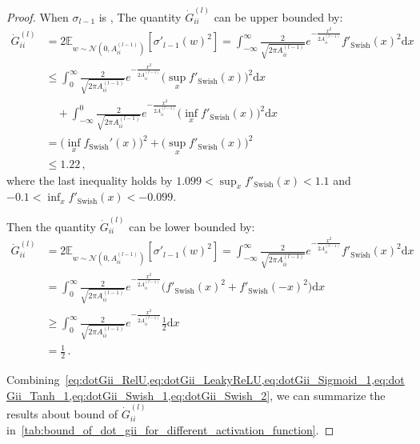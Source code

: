 \documentclass[nohyperref]{article}
\theoremstyle{plain}
\theoremstyle{definition}
\theoremstyle{remark}
\begin{document}
\begin{proof}
When $\sigma_{l-1}$ is , The quantity $\dot{G}^{(l)}_{ii}$ can be upper bounded by:
\begin{equation}
\begin{split}
\dot{G}_{ii}^{(l)}&=2\mathbb{E}_{w \sim \mathcal N(0,A_{ii}^{(l-1)})}[{\sigma}'_{l-1}(w)^2]=\int_{-\infty}^{\infty}\frac{2}{\sqrt{2\pi A_{ii}^{(l-1)}}}e^{-\frac{x^2}{2A_{ii}^{(l-1)}}}f'_{\mathrm{Swish}}(x)^2 \mathrm{d}x\\
&\leq \int_{0}^{\infty}\frac{2}{\sqrt{2\pi A_{ii}^{(l-1)}}}e^{-\frac{x^2}{2A_{ii}^{(l-1)}}}\bigg(\sup_x f'_{\mathrm{Swish}}(x)\bigg)^2 \mathrm{d}x\\
&\quad + \int_{-\infty}^{0}\frac{2}{\sqrt{2\pi A_{ii}^{(l-1)}}}e^{-\frac{x^2}{2A_{ii}^{(l-1)}}}\bigg(\inf_x f'_{\mathrm{Swish}}(x)\bigg)^2 \mathrm{d}x\\
&=\bigg(\inf_x f_{\mathrm{Swish}}'(x)\bigg)^2+\bigg(\sup_x f'_{\mathrm{Swish}}(x)\bigg)^2\\
&\leq 1.22\,,
\end{split}
\label{eq:dotGii_Swish_1}
\end{equation}
where the last inequality holds by $1.099 < \sup_x f'_{\mathrm{Swish}}(x) < 1.1$ and $-0.1 < \inf_x f'_{\mathrm{Swish}}(x) < -0.099$.

Then the quantity $\dot{G}^{(l)}_{ii}$ can be lower bounded by:
\begin{equation}
\begin{split}
\dot{G}_{ii}^{(l)}&=2\mathbb{E}_{w \sim \mathcal N(0,A_{ii}^{(l-1)})}[{\sigma}'_{l-1}(w)^2]=\int_{-\infty}^{\infty}\frac{2}{\sqrt{2\pi A_{ii}^{(l-1)}}}e^{-\frac{x^2}{2A_{ii}^{(l-1)}}}f'_{\mathrm{Swish}}(x)^2 \mathrm{d}x\\
& = \int_{0}^{\infty}\frac{2}{\sqrt{2\pi A_{ii}^{(l-1)}}}e^{-\frac{x^2}{2A_{ii}^{(l-1)}}}\bigg(f'_{\mathrm{Swish}}(x)^2+f'_{\mathrm{Swish}}(-x)^2\bigg)\mathrm{d}x\\
&\geq \int_{0}^{\infty}\frac{2}{\sqrt{2\pi A_{ii}^{(l-1)}}}e^{-\frac{x^2}{2A_{ii}^{(l-1)}}}\frac{1}{2}\mathrm{d}x\\
&= \frac{1}{2}\,.
\end{split}
\label{eq:dotGii_Swish_2}
\end{equation}

Combining~\cref{eq:dotGii_RelU,eq:dotGii_LeakyReLU,eq:dotGii_Sigmoid_1,eq:dotGii_Tanh_1,eq:dotGii_Swish_1,eq:dotGii_Swish_2}, we can summarize the results about bound of $\dot{G}_{ii}^{(l)}$ in~\cref{tab:bound_of_dot_gii_for_different_activation_function}.

\end{proof}
\end{document}
